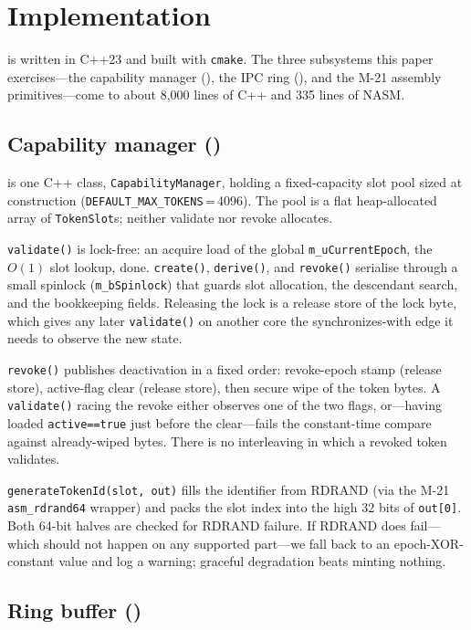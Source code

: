 \section{Implementation}
\label{sec:impl}

\sysname is written in C++23 and built with \texttt{cmake}. The three
subsystems this paper exercises---the capability manager (\Mone), the
IPC ring (\Mthree), and the M-21 assembly primitives---come to about
8,000 lines of C++ and 335 lines of NASM.

\subsection{Capability manager (\Mone)}
\label{sec:impl:cap}

\Mone is one C++ class, \texttt{CapabilityManager}, holding a
fixed-capacity slot pool sized at construction
(\texttt{DEFAULT\_MAX\_TOKENS}\,=\,4096). The pool is a flat
heap-allocated array of \texttt{TokenSlot}s; neither validate nor
revoke allocates.

\texttt{validate()} is lock-free: an acquire load of the global
\texttt{m\_uCurrentEpoch}, the $O(1)$ slot lookup, done.
\texttt{create()}, \texttt{derive()}, and \texttt{revoke()} serialise
through a small spinlock (\texttt{m\_bSpinlock}) that guards slot
allocation, the descendant search, and the bookkeeping fields.
Releasing the lock is a release store of the lock byte, which gives
any later \texttt{validate()} on another core the synchronizes-with
edge it needs to observe the new state.

\texttt{revoke()} publishes deactivation in a fixed order: revoke-epoch
stamp (release store), active-flag clear (release store), then secure
wipe of the token bytes. A \texttt{validate()} racing the revoke
either observes one of the two flags, or---having loaded
\texttt{active==true} just before the clear---fails the constant-time
compare against already-wiped bytes. There is no interleaving in
which a revoked token validates.

\texttt{generateTokenId(slot, out)} fills the identifier from RDRAND
(via the M-21 \texttt{asm\_rdrand64} wrapper) and packs the slot
index into the high 32 bits of \texttt{out[0]}. Both 64-bit halves
are checked for RDRAND failure. If RDRAND does fail---which should
not happen on any supported part---we fall back to an
epoch-XOR-constant value and log a warning; graceful degradation
beats minting nothing.

\subsection{Ring buffer (\Mthree)}
\label{sec:impl:ring}

